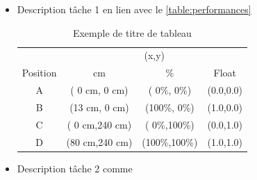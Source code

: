\documentclass[12pt, a4paper]{article}
\begin{document}
\begin{itemize}
\item Description tâche 1 en lien avec le \autoref{table:performances}

\begin{table}[!h]
    \centering
    \caption{Exemple de titre de tableau}
    \label{table:performances}
    \begin{tabular}{c|ccc}
                 &      \multicolumn{3}{c}{(x,y)}            \\
        Position &       cm     &      \%       &   Float     \\
        \hline
        A        & ( 0 cm,  0 cm) & (  0\%,  0\%) & (0.0,0.0)   \\
        B        & (13 cm,  0 cm) & (100\%,  0\%) & (1.0,0.0)   \\
        C        & ( 0 cm,240 cm) & (  0\%,100\%) & (0.0,1.0)   \\
        D        & (80 cm,240 cm) & (100\%,100\%) & (1.0,1.0)   \\
    \end{tabular}
\end{table}

\item Description tâche 2 comme \citep{Zhang2018LSTM}
\end{itemize}



\end{document}
